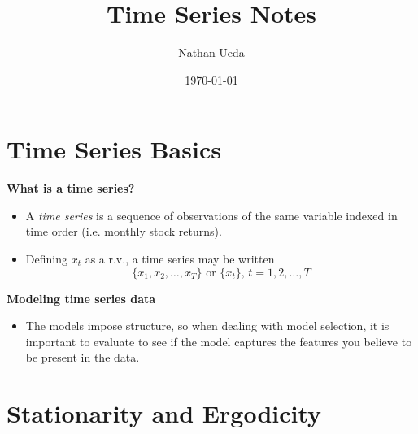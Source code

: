 \documentclass[11pt]{article}
\title{Time Series Notes}
\author{Nathan Ueda}
\date{\today}
\begin{document}
\maketitle 
\pagebreak
\tableofcontents 
\pagebreak

\section{Time Series Basics}

\textbf{What is a time series?}
\begin{itemize}
    \item A \textit{time series} is a sequence of observations of the same variable indexed in 
    time order (i.e. monthly stock returns). 
    \item Defining $x_t$ as a r.v., a time series may be written 
    \[ \{x_1, x_2, \ldots, x_T\} \text{ or }  \{x_t\}, \, t = 1, 2, \ldots, T \]
\end{itemize}

\textbf{Modeling time series data}
\begin{itemize}
    \item The models impose structure, so when dealing with model selection, it is important 
    to evaluate to see if the model captures the features you believe to be present in the data.
\end{itemize}

\section{Stationarity and Ergodicity}
\end{document}
